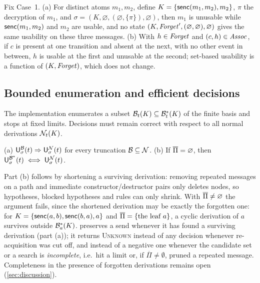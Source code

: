 \begin{proposition}[Separation]\label{prop:separation}
Fix Case~1. (a) For distinct atoms $m_1, m_2$, define $K=\{\mathsf{senc}(m_1,m_2),m_2\}$, $\pi$ the decryption of $m_1$, and $\sigma=(K,\varnothing,(\varnothing,\{\pi\}),\varnothing)$, then $m_1$ is unusable while $\mathsf{senc}(m_1,m_2)$ and $m_2$ are usable, and no state $(K,\mathit{Forget}',(\varnothing,\varnothing),\varnothing)$ gives the same usability on these three messages. (b) With $h\in\mathit{Forget}$ and $(c,h)\in\mathit{Assoc}$, if $c$ is present at one transition and absent at the next, with no other event in between, $h$ is usable at the first and unusable at the second; set-based usability is a function of $(K,\mathit{Forget})$, which does not change.
\end{proposition}

\subsection{Bounded enumeration and efficient decisions}
\label{sec:bounded}
The implementation enumerates a subset $\mathcal{B}_t(K)\subseteq\mathcal{B}^*_t(K)$ of the finite basis and stops at fixed limits. Decisions must remain correct with respect to all normal derivations $\mathcal{N}_t(K)$.

\begin{proposition}\label{prop:bounded}
(a) $\mathsf{U}^{\mathcal{B}}_{\sigma}(t)\Rightarrow\mathsf{U}^{\mathcal{N}}_{\sigma}(t)$ for every truncation $\mathcal{B}\subseteq\mathcal{N}$. (b) If $\overline{\Pi}=\varnothing$, then $\mathsf{U}^{\mathcal{B}^*}_{\sigma}(t)\iff\mathsf{U}^{\mathcal{N}}_{\sigma}(t)$.
\end{proposition}

Part (b) follows by shortening a surviving derivation: removing repeated messages on a path and immediate constructor/destructor pairs only deletes nodes, so hypotheses, blocked hypotheses and rules can only shrink. With $\overline{\Pi}\neq\varnothing$ the argument fails, since the shortened derivation may be exactly the forgotten one: for $K=\{\mathsf{senc}(a,b),\mathsf{senc}(b,a),a\}$ and $\overline{\Pi}=\{\text{the leaf } a\}$, a cyclic derivation of $a$ survives outside $\mathcal{B}^*_a(K)$.  preserves a send whenever it has found a surviving derivation (part (a)); it returns \textsc{Unknown} instead of any decision whenever re-acquisition was cut off, and instead of a negative one whenever the candidate set or a search is \emph{incomplete}, i.e.\ hit a limit or, if $\overline{\Pi}\neq\emptyset$, pruned a repeated message. Completeness in the presence of forgotten derivations remains open (\cref{sec:discussion}).

